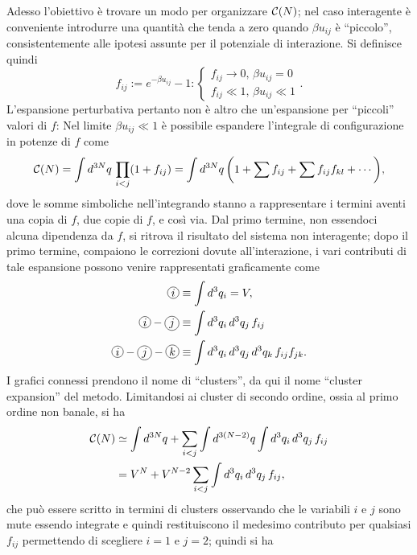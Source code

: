 Adesso l'obiettivo è trovare un modo per organizzare $\mathcal{C}(N)$; nel caso interagente è conveniente introdurre una quantità che tenda a zero quando $\beta u_{ij}$ è ``piccolo'', consistentemente alle ipotesi assunte per il potenziale di interazione. Si definisce quindi
\begin{equation}
    f_{ij} := e^{-\beta u_{ij}} - 1 : \begin{cases}
        f_{ij} \to 0,\,\beta u_{ij} = 0 \\
        f_{ij} \ll 1,\,\beta u_{ij} \ll 1
    \end{cases}.
\end{equation}
L'espansione perturbativa pertanto non è altro che un'espansione per ``piccoli'' valori di $f$: Nel limite $\beta u_{ij} \ll 1$ è possibile espandere l'integrale di configurazione in potenze di $f$ come
\begin{equation}
    \mathcal{C}(N) = \int d^{3N}q\,\prod_{i<j}(1 + f_{ij}) = \int d^{3N}q\,\bigg(1 + \sum f_{ij} + \sum f_{ij}f_{kl} + \cdots\bigg),
\end{equation}
dove le somme simboliche nell'integrando stanno a rappresentare i termini aventi una copia di $f$, due copie di $f$, e così via. Dal primo termine, non essendoci alcuna dipendenza da $f$, si ritrova il risultato del sistema non interagente; dopo il primo termine, compaiono le correzioni dovute all'interazione, i vari contributi di tale espansione possono venire rappresentati graficamente come
\begin{align}
    \circled{i} &\equiv \int d^3q_i = V, \\
    \circled{i} - \circled{j} &\equiv \int d^3q_i\,d^3q_j\,f_{ij} \\
    \circled{i} - \circled{j} - \circled{k} &\equiv \int d^3q_i\,d^3q_j\,d^3q_k\,f_{ij}f_{jk}.
\end{align}
I grafici connessi prendono il nome di ``clusters'', da qui il nome ``cluster expansion'' del metodo. Limitandosi ai cluster di secondo ordine, ossia al primo ordine non banale, si ha
\begin{equation}
    \begin{split}
        \mathcal{C}(N) &\simeq \int d^{3N}q + \sum_{i<j}\int d^{3(N-2)}q\int d^3q_i\,d^3q_j\,f_{ij} \\
        &= V^N + V^{N-2}\sum_{i<j}\int d^3q_i\,d^3q_j\,f_{ij},
    \end{split}
\end{equation}
che può essere scritto in termini di clusters osservando che le variabili $i$ e $j$ sono mute essendo integrate e quindi restituiscono il medesimo contributo per qualsiasi $f_{ij}$ permettendo di scegliere $i = 1$ e $j = 2$; quindi si ha
